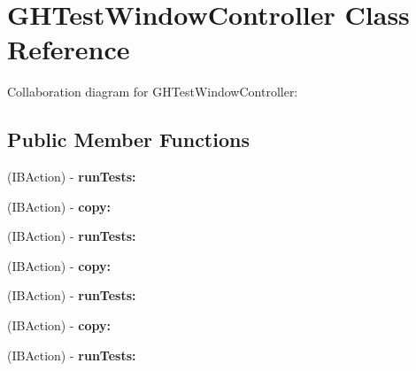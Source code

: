 \hypertarget{interface_g_h_test_window_controller}{
\section{\-G\-H\-Test\-Window\-Controller \-Class \-Reference}
\label{interface_g_h_test_window_controller}
}


\-Collaboration diagram for \-G\-H\-Test\-Window\-Controller\-:
\subsection*{\-Public \-Member \-Functions}
\begin{DoxyCompactItemize}
\item 
\hypertarget{interface_g_h_test_window_controller_aead0e949635d3ba7ed6a0e1b55784ddb}{
(\-I\-B\-Action) -\/ {\bfseries run\-Tests\-:}}
\label{interface_g_h_test_window_controller_aead0e949635d3ba7ed6a0e1b55784ddb}

\item 
\hypertarget{interface_g_h_test_window_controller_a671dea0daf28bdb2ed43c583734701d8}{
(\-I\-B\-Action) -\/ {\bfseries copy\-:}}
\label{interface_g_h_test_window_controller_a671dea0daf28bdb2ed43c583734701d8}

\item 
\hypertarget{interface_g_h_test_window_controller_aead0e949635d3ba7ed6a0e1b55784ddb}{
(\-I\-B\-Action) -\/ {\bfseries run\-Tests\-:}}
\label{interface_g_h_test_window_controller_aead0e949635d3ba7ed6a0e1b55784ddb}

\item 
\hypertarget{interface_g_h_test_window_controller_a671dea0daf28bdb2ed43c583734701d8}{
(\-I\-B\-Action) -\/ {\bfseries copy\-:}}
\label{interface_g_h_test_window_controller_a671dea0daf28bdb2ed43c583734701d8}

\item 
\hypertarget{interface_g_h_test_window_controller_aead0e949635d3ba7ed6a0e1b55784ddb}{
(\-I\-B\-Action) -\/ {\bfseries run\-Tests\-:}}
\label{interface_g_h_test_window_controller_aead0e949635d3ba7ed6a0e1b55784ddb}

\item 
\hypertarget{interface_g_h_test_window_controller_a671dea0daf28bdb2ed43c583734701d8}{
(\-I\-B\-Action) -\/ {\bfseries copy\-:}}
\label{interface_g_h_test_window_controller_a671dea0daf28bdb2ed43c583734701d8}

\item 
\hypertarget{interface_g_h_test_window_controller_aead0e949635d3ba7ed6a0e1b55784ddb}{
(\-I\-B\-Action) -\/ {\bfseries run\-Tests\-:}}
\label{interface_g_h_test_window_controller_aead0e949635d3ba7ed6a0e1b55784ddb}


\end{DoxyCompactItemize}
